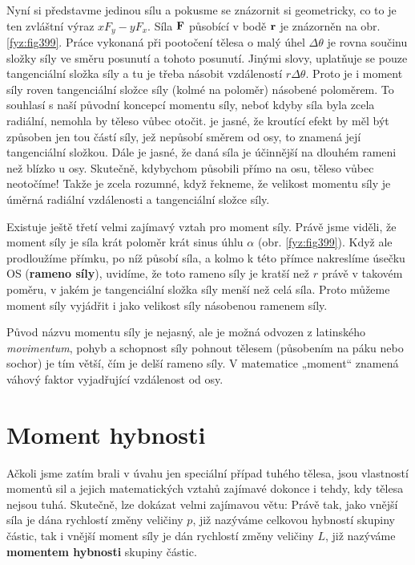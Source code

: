     Nyní si představme jedinou sílu a pokusme se znázornit si geometricky, co to je ten zvláštní
    výraz \( xF_y−yF_x\). Síla \(\mathbf{F}\) působící v bodě \(\mathbf{r}\) je znázorněn na obr.
    \ref{fyz:fig399}. Práce vykonaná při pootočení tělesa o malý úhel \( Δθ\) je rovna součinu
    složky síly ve směru posunutí a tohoto posunutí. Jinými slovy, uplatňuje se pouze tangenciální
    složka síly a tu je třeba násobit vzdáleností \( rΔθ\). Proto je i moment síly roven
    tangenciální složce síly (kolmé na poloměr) násobené poloměrem. To souhlasí s naší původní
    koncepcí momentu síly, neboť kdyby síla byla zcela radiální, nemohla by těleso vůbec otočit. je
    jasné, že kroutící efekt by měl být způsoben jen tou částí síly, jež nepůsobí směrem od osy, to
    znamená její tangenciální složkou. Dále je jasné, že daná síla je účinnější na dlouhém rameni
    než blízko u osy. Skutečně, kdybychom působili přímo na osu, těleso vůbec neotočíme! Takže je
    zcela rozumné, když řekneme, že velikost momentu síly je úměrná radiální vzdálenosti a
    tangenciální složce síly.

    Existuje ještě třetí velmi zajímavý vztah pro moment síly. Právě jsme viděli, že moment síly
    je síla krát poloměr krát sinus úhlu \(\alpha\) (obr. \ref{fyz:fig399}). Když ale prodloužíme
    přímku, po níž působí síla, a kolmo k této přímce nakreslíme úsečku OS (\textbf{rameno síly}),
    uvidíme, že toto rameno síly je kratší než \(r\) právě v takovém poměru, v jakém je tangenciální
    složka síly menší než celá síla. Proto můžeme moment síly vyjádřit i jako velikost síly
    násobenou ramenem síly.

    Původ názvu momentu síly je nejasný, ale je možná odvozen z latinského \emph{movimentum}, pohyb
    a schopnost síly pohnout tělesem (působením na páku nebo sochor) je tím větší, čím je delší
    rameno síly. V matematice „moment“ znamená váhový faktor vyjadřující vzdálenost od osy.    

  \section{Moment hybnosti}\label{fyz:IchapXVIIIsecIII}
    Ačkoli jsme zatím brali v úvahu jen speciální případ tuhého tělesa, jsou vlastností momentů sil
    a jejich matematických vztahů zajímavé dokonce i tehdy, kdy tělesa nejsou tuhá. Skutečně, lze
    dokázat velmi zajímavou větu: Právě tak, jako vnější síla je dána rychlostí změny veličiny
    \(p\), již nazýváme celkovou hybností skupiny částic, tak i vnější moment síly je dán rychlostí
    změny veličiny \(L\), již nazýváme \textbf{momentem hybnosti} skupiny částic.
  
